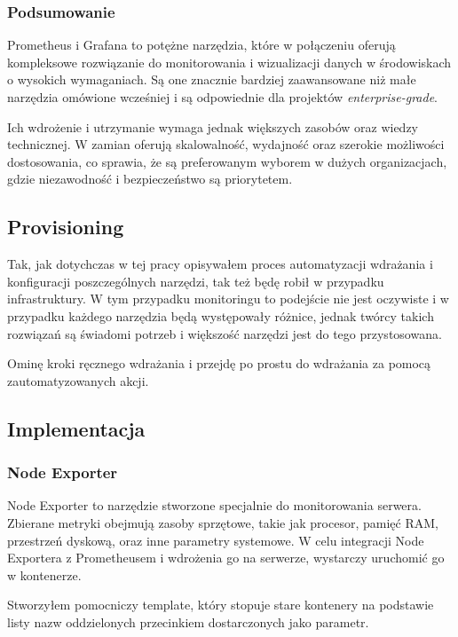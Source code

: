 \documentclass{article}
\begin{document}
\subsubsection{Podsumowanie}

Prometheus i Grafana to potężne narzędzia, które w połączeniu oferują kompleksowe rozwiązanie do monitorowania i wizualizacji danych w środowiskach o wysokich wymaganiach. Są one znacznie bardziej zaawansowane niż małe narzędzia omówione wcześniej i są odpowiednie dla projektów \textit{enterprise-grade}.

Ich wdrożenie i utrzymanie wymaga jednak większych zasobów oraz wiedzy technicznej. W zamian oferują skalowalność, wydajność oraz szerokie możliwości dostosowania, co sprawia, że są preferowanym wyborem w dużych organizacjach, gdzie niezawodność i bezpieczeństwo są priorytetem.

\subsection{Provisioning}

Tak, jak dotychczas w tej pracy opisywałem proces automatyzacji wdrażania i konfiguracji poszczególnych narzędzi, tak też będę robił w przypadku infrastruktury. W tym przypadku monitoringu to podejście nie jest oczywiste i w przypadku każdego narzędzia będą występowały różnice, jednak twórcy takich rozwiązań są świadomi potrzeb i większość narzędzi jest do tego przystosowana.

Ominę kroki ręcznego wdrażania i przejdę po prostu do wdrażania za pomocą zautomatyzowanych akcji.

\subsection{Implementacja}

\subsubsection{Node Exporter}

Node Exporter to narzędzie stworzone specjalnie do monitorowania serwera. Zbierane metryki obejmują zasoby sprzętowe, takie jak procesor, pamięć RAM, przestrzeń dyskową, oraz inne parametry systemowe. W celu integracji Node Exportera z Prometheusem i wdrożenia go na serwerze, wystarczy uruchomić go w kontenerze.

Stworzyłem pomocniczy template, który stopuje stare kontenery na podstawie listy nazw oddzielonych przecinkiem dostarczonych jako parametr.
\end{document}
